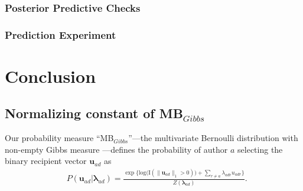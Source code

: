 \documentclass[12pt]{article}
\begin{document}
	\subsubsection{Posterior Predictive Checks}\label{subsubsec:PPC_sanction} 	 
		\subsubsection{Prediction Experiment}\label{subsubsec:Experiment_sanction}  
\section{Conclusion}\label{sec:conclusion}
\newpage


\begin{appendices}
\section{Normalizing constant of MB$_{Gibbs}$}\label{sec: non-empty Gibbs measure}
Our probability measure ``MB$_{Gibbs}$''---the multivariate Bernoulli distribution with non-empty Gibbs measure \citep{fellows2017removing}---defines the probability of author $a$ selecting the binary recipient vector $\boldsymbol{u}_{ad}$ as
\begin{equation*} 
\begin{aligned}
& P(\boldsymbol{u}_{ad}|\boldsymbol{\lambda}_{ad} ) = \frac{\exp\Big\{ \mbox{log}\big(\text{I}(\lVert \boldsymbol{u}_{ad} \rVert_1 > 0)\big) + \sum_{r \neq a} \lambda_{adr}u_{adr} \Big\}}{Z(\boldsymbol{\lambda}_{ad})}.
\end{aligned}
\end{equation*}


\end{appendices}
\end{document}
